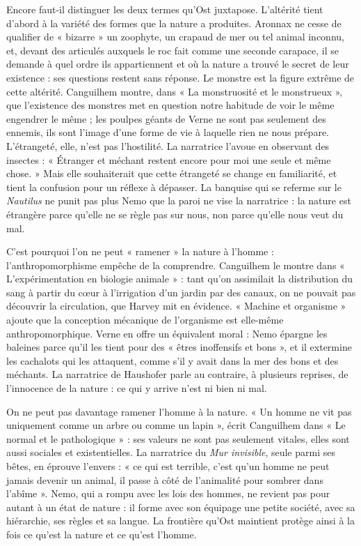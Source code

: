 \documentclass[11pt,a4paper]{article}
\begin{document}
Encore faut-il distinguer les deux termes qu'Ost juxtapose. L'altérité tient d'abord à la variété des formes que la nature a produites. Aronnax ne cesse de qualifier de « bizarre » un zoophyte, un crapaud de mer ou tel animal inconnu, et, devant des articulés auxquels le roc fait comme une seconde carapace, il se demande à quel ordre ils appartiennent et où la nature a trouvé le secret de leur existence : ses questions restent sans réponse. Le monstre est la figure extrême de cette altérité. Canguilhem montre, dans « La monstruosité et le monstrueux », que l'existence des monstres met en question notre habitude de voir le même engendrer le même ; les poulpes géants de Verne ne sont pas seulement des ennemis, ils sont l'image d'une forme de vie à laquelle rien ne nous prépare. L'étrangeté, elle, n'est pas l'hostilité. La narratrice l'avoue en observant des insectes : « Étranger et méchant restent encore pour moi une seule et même chose. » Mais elle souhaiterait que cette étrangeté se change en familiarité, et tient la confusion pour un réflexe à dépasser. La banquise qui se referme sur le \emph{Nautilus} ne punit pas plus Nemo que la paroi ne vise la narratrice : la nature est étrangère parce qu'elle ne se règle pas sur nous, non parce qu'elle nous veut du mal.

C'est pourquoi l'on ne peut « ramener » la nature à l'homme : l'anthropomorphisme empêche de la comprendre. Canguilhem le montre dans « L'expérimentation en biologie animale » : tant qu'on assimilait la distribution du sang à partir du cœur à l'irrigation d'un jardin par des canaux, on ne pouvait pas découvrir la circulation, que Harvey mit en évidence. « Machine et organisme » ajoute que la conception mécanique de l'organisme est elle-même anthropomorphique. Verne en offre un équivalent moral : Nemo épargne les baleines parce qu'il les tient pour des « êtres inoffensifs et bons », et il extermine les cachalots qui les attaquent, comme s'il y avait dans la mer des bons et des méchants. La narratrice de Haushofer parle au contraire, à plusieurs reprises, de l'innocence de la nature : ce qui y arrive n'est ni bien ni mal.

On ne peut pas davantage ramener l'homme à la nature. « Un homme ne vit pas uniquement comme un arbre ou comme un lapin », écrit Canguilhem dans « Le normal et le pathologique » : ses valeurs ne sont pas seulement vitales, elles sont aussi sociales et existentielles. La narratrice du \emph{Mur invisible}, seule parmi ses bêtes, en éprouve l'envers : « ce qui est terrible, c'est qu'un homme ne peut jamais devenir un animal, il passe à côté de l'animalité pour sombrer dans l'abîme ». Nemo, qui a rompu avec les lois des hommes, ne revient pas pour autant à un état de nature : il forme avec son équipage une petite société, avec sa hiérarchie, ses règles et sa langue. La frontière qu'Ost maintient protège ainsi à la fois ce qu'est la nature et ce qu'est l'homme.
\end{document}
